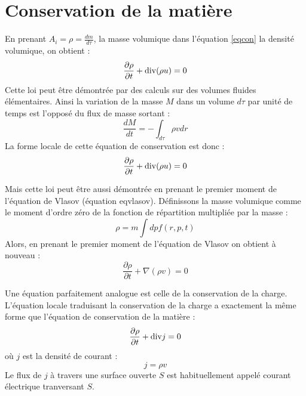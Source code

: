 \documentclass[12pt]{book}
\begin{document}
\section{Conservation de la mati\`ere}
En prenant $A_i=\rho=\frac{dm}{d\tau}$, la masse volumique dans
l'\'equation \ref{eqcon} 
la densit\'e volumique, on obtient :
\begin{equation}
\frac{\partial \rho}{\partial t}+{\rm div} (\rho u)=0
\end{equation}
Cette loi peut \^etre d\'emontr\'ee par des calculs sur des volumes
fluides \'el\'ementaires. Ainsi la variation de la masse $M$ dans un
volume $d\tau$ par unit\'e de temps est l'oppos\'e du flux de masse
sortant :
\begin{equation}
\frac{dM}{dt}=-\int_{d\tau} \rho v dr
\end{equation}
La forme locale de cette \'equation de conservation est donc :
\begin{equation}
\frac{\partial \rho}{\partial t}+{\rm div} (\rho u)=0
\end{equation}

Mais cette loi peut \^etre aussi d\'emontr\'ee en prenant le premier
moment de l'\'equation  de Vlasov (\'equation {eqvlasov}). D\'efinissons la masse volumique
comme le moment d'ordre z\'ero de la fonction de r\'epartition
multipli\'ee par la masse : 
\begin{equation}
\rho=m\int dpf(r,p,t)
\end{equation}
Alors, en prenant le premier
moment de l'\'equation  de Vlasov on obtient \`a nouveau :
\begin{equation}
\frac{\partial \rho}{\partial t}+\nabla (\rho v)=0
\end{equation}

Une \'equation parfaitement analogue est celle de la conservation de
la charge.
L'\'equation locale traduisant la conservation de la charge a
exactement la m\^eme forme que l'\'equation de conservation de la
mati\`ere :
\begin{equation}
\frac{\partial \rho}{\partial t}+{\rm div}{j}=0
\end{equation}
o\`u $j$ est la densit\'e de courant :
\begin{equation}
j=\rho v
\end{equation}
Le flux de $j$ \`a travers une surface ouverte $S$ est habituellement
appel\'e courant \'electrique tranversant $S$.
\end{document}
